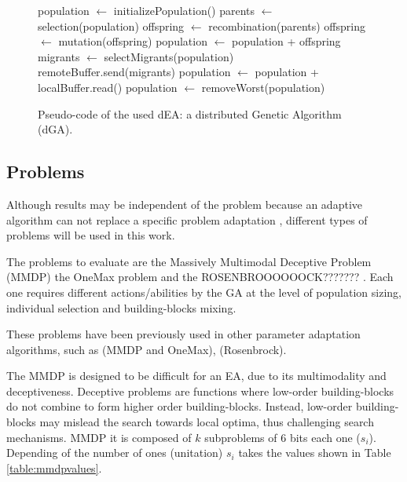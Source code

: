 \documentclass[final,1p,times]{elsarticle}
\begin{document}
\begin{figure}[htb]

\begin{algorithmic}
\STATE population $\gets$ initializePopulation()
    \STATE parents $\gets$ selection(population)
    \STATE offspring $\gets$ recombination(parents)
    \STATE offspring $\gets$ mutation(offspring)
    \STATE population $\gets$ population + offspring
      \STATE migrants $\gets$ selectMigrants(population)
      \STATE remoteBuffer.send(migrants)
    \ENDIF
      \STATE population $\gets$ population + localBuffer.read()
    \ENDIF
    \STATE population $\gets$ removeWorst(population)
\ENDWHILE

\end{algorithmic}
\caption{Pseudo-code of the used dEA: a distributed Genetic Algorithm (dGA).}
\label{fig:EA}
\end{figure}




\subsection{Problems}

Although results may be independent of the problem because an adaptive algorithm can not replace a specific problem adaptation \cite{PanaceasClune05}, different types of problems will be used in this work.

The problems to evaluate are the Massively Multimodal Deceptive
Problem (MMDP) \cite{goldberg92massive}  the OneMax problem
\cite{ONEMAX} and the ROSENBROOOOOOCK??????? \cite{}. Each one requires different actions/abilities by the GA
at the level of population sizing, individual selection and
building-blocks mixing. 

These problems have been previously used in other parameter adaptation algorithms, such as \cite{ParallelGATongchim02} (MMDP and OneMax), \cite{DifferentialWeber09,AdaptationSizesSchlierkamp96} (Rosenbrock). 


The MMDP
 is designed to be difficult for an EA, due to
its multimodality and deceptiveness. Deceptive problems are functions where low-order building-blocks do not combine to form higher order building-blocks. Instead, low-order building-blocks may mislead the search towards local optima, thus challenging search mechanisms. MMDP it is composed of $k$ subproblems of 6 bits each one ($s_i$). Depending of
the number of ones (unitation) $s_i$ takes the values shown in Table \ref{table:mmdpvalues}.  
\end{document}
